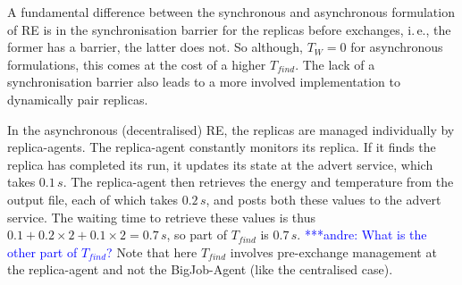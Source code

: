 \documentclass{rspublic}
\newcommand{\alnote}[1]{ {\textcolor{blue} { ***andre: #1 }}}
\newcommand{\alnote}[1]{}
\begin{document}



A fundamental difference between the synchronous and asynchronous
formulation of RE is in the synchronisation barrier for the replicas
before exchanges, i.\,e., the former has a barrier, the latter does not.
So although, $T_W = 0$ for asynchronous formulations, this comes at
the cost of a higher $T_{find}$. The lack of a synchronisation barrier
also leads to a more involved implementation to dynamically pair replicas.

In the asynchronous (decentralised) RE, the replicas are managed
individually by replica-agents. The replica-agent constantly monitors
its replica. If it finds the replica has completed its run, it updates
its state at the advert service, which takes $0.1\,s$.  The
replica-agent then retrieves the energy and temperature from the output
file, each of which takes $0.2\,s$, and posts both these values
to the advert service.  The waiting time to retrieve these values is
thus $0.1+0.2\times2+0.1\times2=0.7\,s$, so part of $T_{find}$ is $0.7\,s$. 
\alnote{What is the other part of $T_{find}$?}  Note that
here $T_{find}$ involves pre-exchange management at the replica-agent and not the 
BigJob-Agent (like the centralised case).  %
\end{document}
